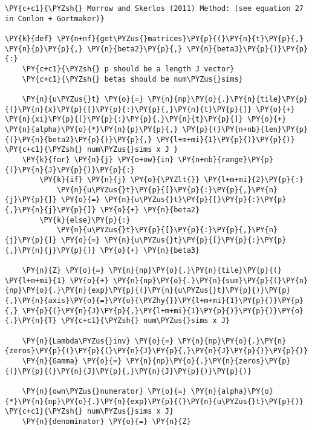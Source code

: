     \begin{tcolorbox}[breakable, size=fbox, boxrule=1pt, pad at break*=1mm,colback=cellbackground, colframe=cellborder]
\begin{Verbatim}[commandchars=\\\{\}]
\PY{c+c1}{\PYZsh{} Morrow and Skerlos (2011) Method: (see equation 27 in Conlon + Gortmaker)}

\PY{k}{def} \PY{n+nf}{get\PYZus{}matrices}\PY{p}{(}\PY{n}{t}\PY{p}{,} \PY{n}{p}\PY{p}{,} \PY{n}{beta2}\PY{p}{,} \PY{n}{beta3}\PY{p}{)}\PY{p}{:}
    \PY{c+c1}{\PYZsh{} p should be a length J vector}
    \PY{c+c1}{\PYZsh{} betas should be num\PYZus{}sims}

    \PY{n}{u\PYZus{}t} \PY{o}{=} \PY{n}{np}\PY{o}{.}\PY{n}{tile}\PY{p}{(}\PY{n}{x}\PY{p}{[}\PY{p}{:}\PY{p}{,}\PY{n}{t}\PY{p}{]} \PY{o}{+} \PY{n}{xi}\PY{p}{[}\PY{p}{:}\PY{p}{,}\PY{n}{t}\PY{p}{]} \PY{o}{+} \PY{n}{alpha}\PY{o}{*}\PY{n}{p}\PY{p}{,} \PY{p}{(}\PY{n+nb}{len}\PY{p}{(}\PY{n}{beta2}\PY{p}{)}\PY{p}{,} \PY{l+m+mi}{1}\PY{p}{)}\PY{p}{)} \PY{c+c1}{\PYZsh{} num\PYZus{}sims x J }
    \PY{k}{for} \PY{n}{j} \PY{o+ow}{in} \PY{n+nb}{range}\PY{p}{(}\PY{n}{J}\PY{p}{)}\PY{p}{:}
        \PY{k}{if} \PY{n}{j} \PY{o}{\PYZlt{}} \PY{l+m+mi}{2}\PY{p}{:}
            \PY{n}{u\PYZus{}t}\PY{p}{[}\PY{p}{:}\PY{p}{,}\PY{n}{j}\PY{p}{]} \PY{o}{=} \PY{n}{u\PYZus{}t}\PY{p}{[}\PY{p}{:}\PY{p}{,}\PY{n}{j}\PY{p}{]} \PY{o}{+} \PY{n}{beta2}
        \PY{k}{else}\PY{p}{:}
            \PY{n}{u\PYZus{}t}\PY{p}{[}\PY{p}{:}\PY{p}{,}\PY{n}{j}\PY{p}{]} \PY{o}{=} \PY{n}{u\PYZus{}t}\PY{p}{[}\PY{p}{:}\PY{p}{,}\PY{n}{j}\PY{p}{]} \PY{o}{+} \PY{n}{beta3}

    \PY{n}{Z} \PY{o}{=} \PY{n}{np}\PY{o}{.}\PY{n}{tile}\PY{p}{(} \PY{l+m+mi}{1} \PY{o}{+} \PY{n}{np}\PY{o}{.}\PY{n}{sum}\PY{p}{(}\PY{n}{np}\PY{o}{.}\PY{n}{exp}\PY{p}{(}\PY{n}{u\PYZus{}t}\PY{p}{)}\PY{p}{,}\PY{n}{axis}\PY{o}{=}\PY{o}{\PYZhy{}}\PY{l+m+mi}{1}\PY{p}{)}\PY{p}{,} \PY{p}{(}\PY{n}{J}\PY{p}{,}\PY{l+m+mi}{1}\PY{p}{)}\PY{p}{)}\PY{o}{.}\PY{n}{T} \PY{c+c1}{\PYZsh{} num\PYZus{}sims x J}

    \PY{n}{Lambda\PYZus{}inv} \PY{o}{=} \PY{n}{np}\PY{o}{.}\PY{n}{zeros}\PY{p}{(}\PY{p}{(}\PY{n}{J}\PY{p}{,}\PY{n}{J}\PY{p}{)}\PY{p}{)}
    \PY{n}{Gamma} \PY{o}{=} \PY{n}{np}\PY{o}{.}\PY{n}{zeros}\PY{p}{(}\PY{p}{(}\PY{n}{J}\PY{p}{,}\PY{n}{J}\PY{p}{)}\PY{p}{)}

    \PY{n}{own\PYZus{}numerator} \PY{o}{=} \PY{n}{alpha}\PY{o}{*}\PY{n}{np}\PY{o}{.}\PY{n}{exp}\PY{p}{(}\PY{n}{u\PYZus{}t}\PY{p}{)}  \PY{c+c1}{\PYZsh{} num\PYZus{}sims x J}
    \PY{n}{denominator} \PY{o}{=} \PY{n}{Z}


\end{Verbatim}
\end{tcolorbox}
